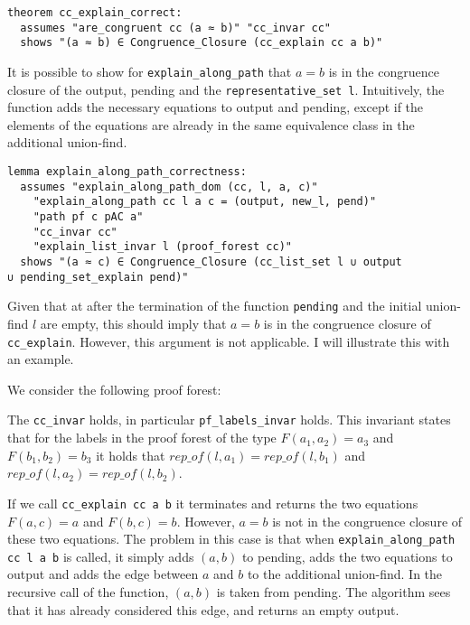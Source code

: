 \begin{lstlisting}
theorem cc_explain_correct:
  assumes "are_congruent cc (a ≈ b)" "cc_invar cc"
  shows "(a ≈ b) ∈ Congruence_Closure (cc_explain cc a b)"
\end{lstlisting}

It is possible to show for \lstinline{explain_along_path} that $a = b$ is in the congruence closure of the output, pending and the \lstinline{representative_set l}. Intuitively, the function adds the necessary equations to output and pending, except if the elements of the equations are already in the same equivalence class in the additional union-find.

\begin{lstlisting}
lemma explain_along_path_correctness:
  assumes "explain_along_path_dom (cc, l, a, c)"
    "explain_along_path cc l a c = (output, new_l, pend)"
    "path pf c pAC a"
    "cc_invar cc"
    "explain_list_invar l (proof_forest cc)"
  shows "(a ≈ c) ∈ Congruence_Closure (cc_list_set l ∪ output
∪ pending_set_explain pend)"
\end{lstlisting}

Given that at after the termination of the function \lstinline{pending} and the initial union-find $l$ are empty, this should imply that $a = b$ is in the congruence closure of \lstinline{cc_explain}.
However, this argument is not applicable. I will illustrate this with an example.

\begin{exmp}
We consider the following proof forest:

\begin{center}
\end{center}

The \lstinline{cc_invar} holds, in particular \lstinline{pf_labels_invar} holds. This invariant states that for the labels in the proof forest of the type $F(a_1, a_2) = a_3$ and $F(b_1, b_2) = b_3$ it holds that $rep\_of(l, a_1) = rep\_of(l, b_1)$ and $rep\_of(l, a_2) = rep\_of(l, b_2)$.

If we call \lstinline{cc_explain cc a b} it terminates and returns the two equations $F(a,c) = a$ and $F(b,c) = b$.
However, $a = b$ is not in the congruence closure of these two equations.
The problem in this case is that when \lstinline{explain_along_path cc l a b} is called, it simply adds $(a, b)$ to pending, adds the two equations to output and adds the edge between $a$ and $b$ to the additional union-find.
In the recursive call of the function, $(a,b)$ is taken from pending.
The algorithm sees that it has already considered this edge, and returns an empty output.
\end{exmp}

